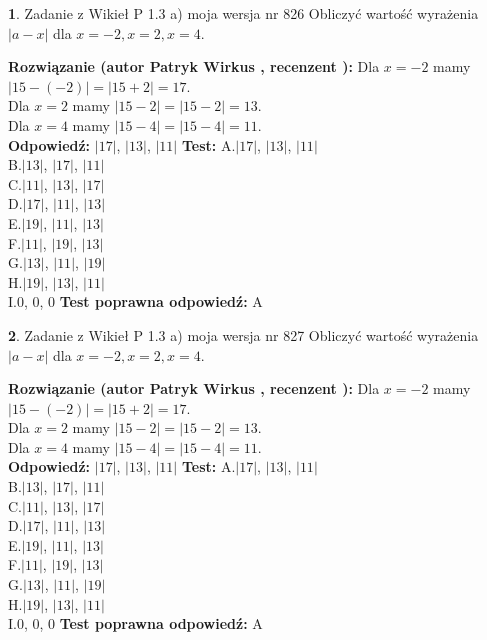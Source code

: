 \documentclass[12pt, a4paper]{article}
\theoremstyle{definition} %
\newtheorem{zad}{}
\newcommand{\zadStart}[1]{\begin{zad}#1\newline}
\newcommand{\zadStop}{\end{zad}}
\newcommand{\rozwStart}[2]{\noindent \textbf{Rozwiązanie (autor #1 , recenzent #2): }\newline}
\newcommand{\rozwStop}{\newline}
\newcommand{\odpStart}{\noindent \textbf{Odpowiedź:}\newline}
\newcommand{\odpStop}{\newline}
\newcommand{\testStart}{\noindent \textbf{Test:}\newline}
\newcommand{\testStop}{\newline}
\newcommand{\kluczStart}{\noindent \textbf{Test poprawna odpowiedź:}\newline}
\newcommand{\kluczStop}{\newline}
\begin{document}
\zadStart{Zadanie z Wikieł P 1.3 a) moja wersja nr 826}
Obliczyć wartość wyrażenia $|a - x|$ dla $x=-2,x=2,x=4$.
\zadStop
\rozwStart{Patryk Wirkus}{}
Dla $x = -2$ mamy $|15 - (-2)| = |15 + 2| = 17$.\\
Dla $x = 2$ mamy $|15 - 2| = |15 - 2| = 13$.\\
Dla $x = 4$ mamy $|15 - 4| = |15 - 4| = 11$.\\
\rozwStop
\odpStart
$|17|$, $|13|$, $|11|$
\odpStop
\testStart
A.$|17|$, $|13|$, $|11|$\\
B.$|13|$, $|17|$, $|11|$\\
C.$|11|$, $|13|$, $|17|$\\
D.$|17|$, $|11|$, $|13|$\\
E.$|19|$, $|11|$, $|13|$\\
F.$|11|$, $|19|$, $|13|$\\
G.$|13|$, $|11|$, $|19|$\\
H.$|19|$, $|13|$, $|11|$\\
I.$0$, $0$, $0$
\testStop
\kluczStart
A
\kluczStop



\zadStart{Zadanie z Wikieł P 1.3 a) moja wersja nr 827}
Obliczyć wartość wyrażenia $|a - x|$ dla $x=-2,x=2,x=4$.
\zadStop
\rozwStart{Patryk Wirkus}{}
Dla $x = -2$ mamy $|15 - (-2)| = |15 + 2| = 17$.\\
Dla $x = 2$ mamy $|15 - 2| = |15 - 2| = 13$.\\
Dla $x = 4$ mamy $|15 - 4| = |15 - 4| = 11$.\\
\rozwStop
\odpStart
$|17|$, $|13|$, $|11|$
\odpStop
\testStart
A.$|17|$, $|13|$, $|11|$\\
B.$|13|$, $|17|$, $|11|$\\
C.$|11|$, $|13|$, $|17|$\\
D.$|17|$, $|11|$, $|13|$\\
E.$|19|$, $|11|$, $|13|$\\
F.$|11|$, $|19|$, $|13|$\\
G.$|13|$, $|11|$, $|19|$\\
H.$|19|$, $|13|$, $|11|$\\
I.$0$, $0$, $0$
\testStop
\kluczStart
A
\kluczStop
\end{document}
